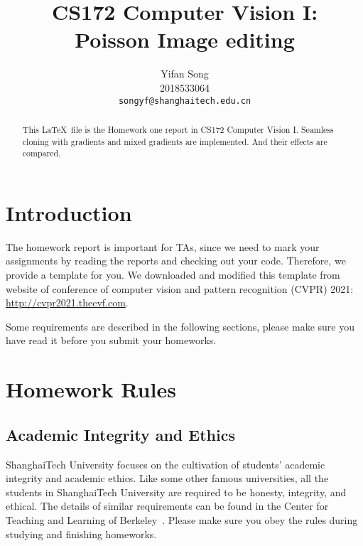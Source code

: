 \documentclass[10pt,twocolumn,letterpaper]{article}
\begin{document}
\title{CS172 Computer Vision I: \\ Poisson Image editing}

\author{Yifan Song\\
2018533064\\
{\tt\small songyf@shanghaitech.edu.cn}
}

\maketitle

\begin{abstract}
This \LaTeX\ file is the Homework one report in CS172 Computer Vision I. Seamless cloning with gradients and mixed gradients are implemented. And their effects are compared.
\end{abstract}

\section{Introduction}
The homework report is important for TAs, since we need to mark your assignments by reading the reports and checking out your code. Therefore, we provide a template for you. We downloaded and modified this template from website of conference of computer vision and pattern recognition (CVPR) 2021: \url{http://cvpr2021.thecvf.com}.

Some requirements are described in the following sections, please make sure you have read it before you submit your homeworks.

\section{Homework Rules}

\subsection{Academic Integrity and Ethics}
 ShanghaiTech University focuses on the cultivation of students' academic integrity and academic ethics.  Like some other famous universities, all the students in ShanghaiTech University are required to be honesty, integrity, and ethical. The details of similar requirements can be found in the Center for Teaching and Learning of Berkeley~\cite{rules}. Please make sure you obey the rules during studying and finishing homeworks.
 
\end{document}
